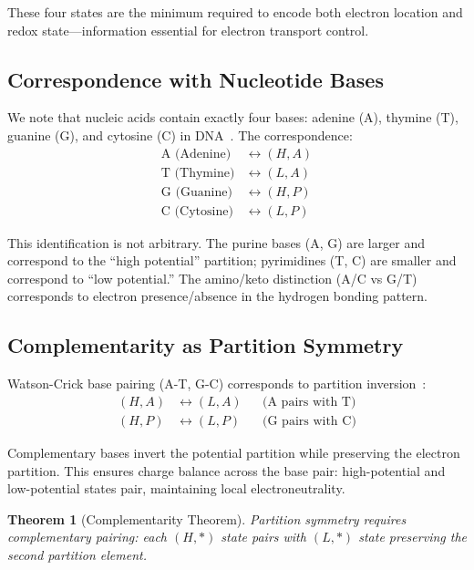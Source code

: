 \documentclass[twocolumn,aps,prb,superscriptaddress,longbibliography,floatfix]{revtex4-2}
\newtheorem{theorem}{Theorem}[section]
\theoremstyle{remark}
\begin{document}
These four states are the minimum required to encode both electron
location and redox state---information essential for electron transport
control.

\subsection{Correspondence with Nucleotide Bases}

We note that nucleic acids contain exactly four bases: adenine (A),
thymine (T), guanine (G), and cytosine (C) in DNA~\cite{Watson1953}. The
correspondence:
\begin{align}
\text{A (Adenine)} &\leftrightarrow (H, A) \\
\text{T (Thymine)} &\leftrightarrow (L, A) \\
\text{G (Guanine)} &\leftrightarrow (H, P) \\
\text{C (Cytosine)} &\leftrightarrow (L, P)
\end{align}

This identification is not arbitrary. The purine bases (A, G) are larger
and correspond to the ``high potential'' partition; pyrimidines (T, C)
are smaller and correspond to ``low potential.'' The amino/keto
distinction (A/C vs G/T) corresponds to electron presence/absence in the
hydrogen bonding pattern.

\subsection{Complementarity as Partition Symmetry}

Watson-Crick base pairing (A-T, G-C) corresponds to partition
inversion~\cite{Watson1953}:
\begin{align}
(H, A) &\leftrightarrow (L, A) && \text{(A pairs with T)} \\
(H, P) &\leftrightarrow (L, P) && \text{(G pairs with C)}
\end{align}

Complementary bases invert the potential partition while preserving the
electron partition. This ensures charge balance across the base pair:
high-potential and low-potential states pair, maintaining local
electroneutrality.

\begin{theorem}[Complementarity Theorem]
\label{thm:complementarity}
Partition symmetry requires complementary pairing: each $(H, *)$ state
pairs with $(L, *)$ state preserving the second partition element.
\end{theorem}
\end{document}
